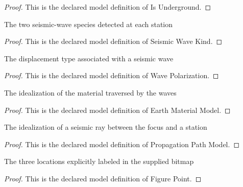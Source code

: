 \begin{proof}
  This is the declared model definition of Is Underground.
\end{proof}
\begin{definition}
  \label{def:physics:phyx-mini-0239:phyxminiproblems-problemphyxmini0239-seismicwavekind}
  The two seismic-wave species detected at each station
\end{definition}
\begin{proof}
  This is the declared model definition of Seismic Wave Kind.
\end{proof}
\begin{definition}
  \label{def:physics:phyx-mini-0239:phyxminiproblems-problemphyxmini0239-wavepolarization}
  The displacement type associated with a seismic wave
\end{definition}
\begin{proof}
  This is the declared model definition of Wave Polarization.
\end{proof}
\begin{definition}
  \label{def:physics:phyx-mini-0239:phyxminiproblems-problemphyxmini0239-earthmaterialmodel}
  The idealization of the material traversed by the waves
\end{definition}
\begin{proof}
  This is the declared model definition of Earth Material Model.
\end{proof}
\begin{definition}
  \label{def:physics:phyx-mini-0239:phyxminiproblems-problemphyxmini0239-propagationpathmodel}
  The idealization of a seismic ray between the focus and a station
\end{definition}
\begin{proof}
  This is the declared model definition of Propagation Path Model.
\end{proof}
\begin{definition}
  \label{def:physics:phyx-mini-0239:phyxminiproblems-problemphyxmini0239-figurepoint}
  The three locations explicitly labeled in the supplied bitmap
\end{definition}
\begin{proof}
  This is the declared model definition of Figure Point.
\end{proof}
